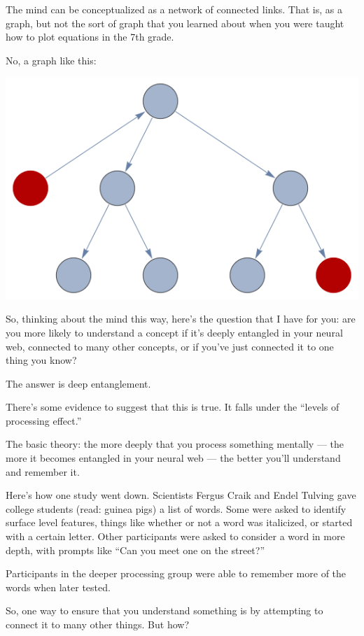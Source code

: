 The mind can be conceptualized as a network of connected links. That is, as a
graph, but not the sort of graph that you learned about when you were taught how to plot
equations in the 7th grade.

No, a graph like this:

\includegraphics[width=\textwidth]{graphics/graph.png}

So, thinking about the mind this way, here's the question that I have for you:
are you more likely to understand a concept if it's deeply entangled in your
neural web, connected to many other concepts, or if you've just
connected it to one thing you know?

The answer is deep entanglement.

There's some evidence to suggest that this is true. It falls under the ``levels
of processing effect.''

The basic theory: the more deeply that you process something mentally --- the more it
becomes entangled in your neural web --- the better you'll understand and remember
it.

Here's how one study went down. Scientists Fergus Craik and Endel Tulving gave
college students (read: guinea pigs) a list of words. Some were asked to identify surface level features, things like
whether or not a word was italicized, or started with a certain letter. Other
participants were asked to consider a word in more depth, with prompts like ``Can you meet
one on the street?''

Participants in the deeper processing group were able to remember more of the
words when later tested.\cite{craik1975depth}

So, one way to ensure that you understand something is by attempting to connect
it to many other things. But how?

